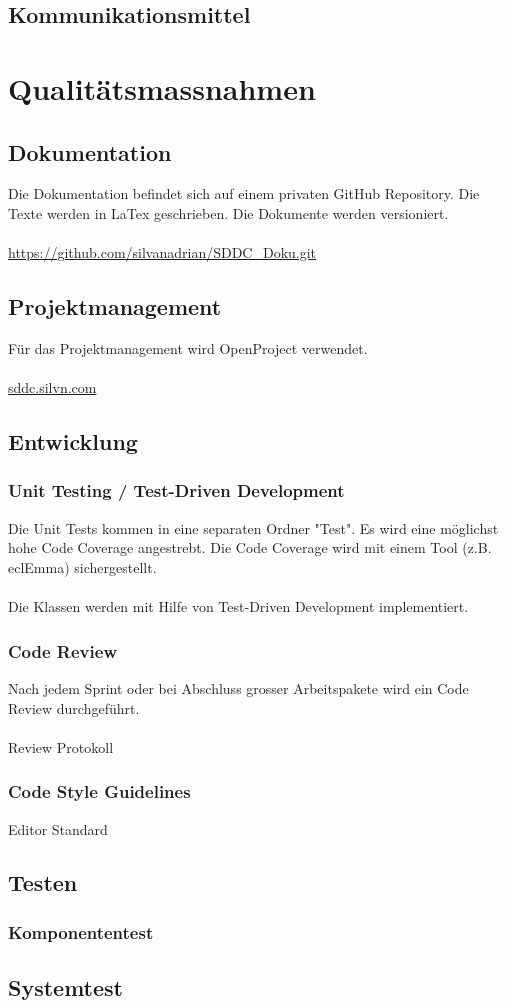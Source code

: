 \documentclass[11pt]{scrartcl}
\begin{document}
\subsection{Kommunikationsmittel}

\section{Qualitätsmassnahmen}
\subsection{Dokumentation}
Die Dokumentation befindet sich auf einem privaten GitHub Repository.
Die Texte werden in LaTex geschrieben. Die Dokumente werden versioniert.\\
\\
\url{https://github.com/silvanadrian/SDDC_Doku.git}

\subsection{Projektmanagement}
Für das Projektmanagement wird OpenProject verwendet.\\
\\
\url{sddc.silvn.com}


\subsection{Entwicklung}
\subsubsection{Unit Testing / Test-Driven Development}
Die Unit Tests kommen in eine separaten Ordner "Test".
Es wird eine möglichst hohe Code Coverage angestrebt.
Die Code Coverage wird mit einem Tool (z.B. eclEmma) sichergestellt.\\
\\
Die Klassen werden mit Hilfe von Test-Driven Development implementiert.

\subsubsection{Code Review}
Nach jedem Sprint oder bei Abschluss grosser Arbeitspakete wird ein Code Review durchgeführt.\\
\\
Review Protokoll

\subsubsection{Code Style Guidelines}
Editor Standard

\subsection{Testen}

\subsubsection{Komponententest}

\subsection{Systemtest}
\end{document}
